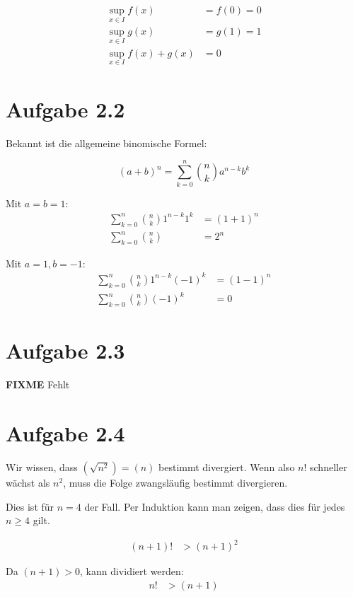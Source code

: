 \documentclass[a4paper,german,12pt,smallheadings]{scrartcl}
\begin{document}
\begin{align*}
  \sup_{x \in I} f(x) &= f(0) = 0 \\
  \sup_{x \in I} g(x) &= g(1) = 1 \\
  \sup_{x \in I} f(x) + g(x) &= 0
\end{align*}

\section*{Aufgabe 2.2}

Bekannt ist die allgemeine binomische Formel:

\begin{equation*}
  (a+b)^n = \sum_{k=0}^n {n \choose k} a^{n-k} b^k
\end{equation*}

Mit $a=b=1$:
\begin{align*}
 \sum_{k=0}^n {n \choose k} 1^{n-k} 1^k &= (1+1)^n \\
  \sum_{k=0}^n {n \choose k} &= 2^n
\end{align*}

Mit $a=1, b=-1$:
\begin{align*}
  \sum_{k=0}^n {n \choose k} 1^{n-k} (-1)^k &= (1-1)^n \\
  \sum_{k=0}^n {n \choose k} (-1)^k &= 0
\end{align*}


\section*{Aufgabe 2.3}
\textbf{FIXME} Fehlt %

\section*{Aufgabe 2.4}
Wir wissen, dass $\left(\sqrt{n^2}\right) = (n)$ bestimmt divergiert. Wenn also
$n!$ schneller wächst als $n^2$, muss die Folge zwangsläufig bestimmt
divergieren.

Dies ist für $n = 4$ der Fall. Per Induktion kann man zeigen, dass dies für
jedes $n \ge 4$ gilt.

\begin{align*}
  (n+1)! &\gt (n+1)^2
\end{align*}

Da $(n+1) \gt 0$, kann dividiert werden:
\begin{align*}
  n! &\gt (n+1)
\end{align*}
\end{document}
